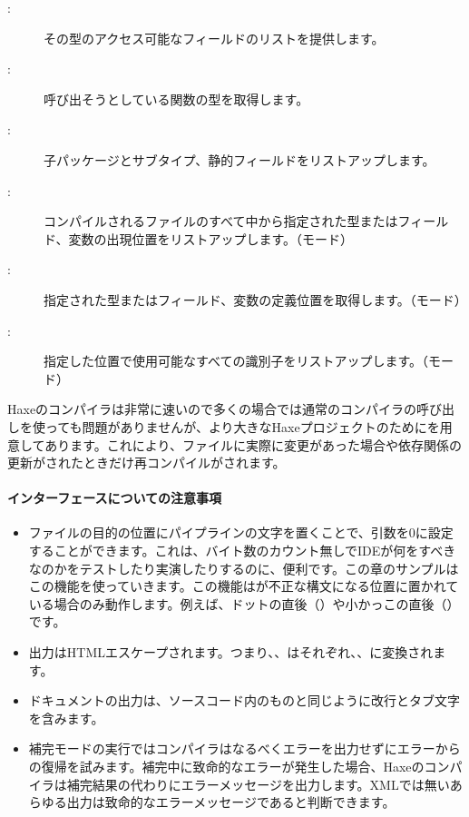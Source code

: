 \begin{description}
	\item[:] その型のアクセス可能なフィールドのリストを提供します。
	\item[:] 呼び出そうとしている関数の型を取得します。
	\item[:] 子パッケージとサブタイプ、静的フィールドをリストアップします。
	\item[:] コンパイルされるファイルのすべて中から指定された型またはフィールド、変数の出現位置をリストアップします。（モード）
	\item[:] 指定された型またはフィールド、変数の定義位置を取得します。（モード）
	\item[:] 指定した位置で使用可能なすべての識別子をリストアップします。（モード）
\end{description}

Haxeのコンパイラは非常に速いので多くの場合では通常のコンパイラの呼び出しを使っても問題がありませんが、より大きなHaxeプロジェクトのためにを用意してあります。これにより、ファイルに実際に変更があった場合や依存関係の更新がされたときだけ再コンパイルがされます。

\paragraph{インターフェースについての注意事項}
\label{cr-completion-interface-notes}

\begin{itemize}
	\item ファイルの目的の位置にパイプライン\ic{|}の文字を置くことで、引数を0に設定することができます。これは、バイト数のカウント無しでIDEが何をすべきなのかをテストしたり実演したりするのに、便利です。この章のサンプルはこの機能を使っていきます。この機能は\ic{|}が不正な構文になる位置に置かれている場合のみ動作します。例えば、ドットの直後（）や小かっこの直後（\ic{(|}）です。
	\item 出力はHTMLエスケープされます。つまり\ic{\&}、\ic{<}、\ic{>}はそれぞれ、、に変換されます。
	\item ドキュメントの出力は、ソースコード内のものと同じように改行とタブ文字を含みます。
	\item 補完モードの実行ではコンパイラはなるべくエラーを出力せずにエラーからの復帰を試みます。補完中に致命的なエラーが発生した場合、Haxeのコンパイラは補完結果の代わりにエラーメッセージを出力します。XMLでは無いあらゆる出力は致命的なエラーメッセージであると判断できます。
\end{itemize}

